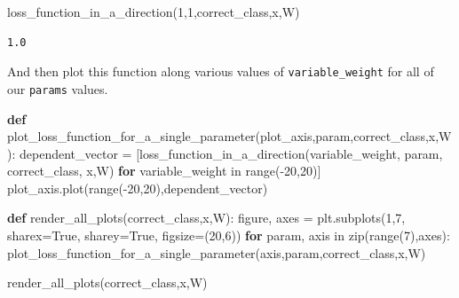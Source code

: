\documentclass[]{report}
\newenvironment{Shaded}{}{}
\newcommand{\KeywordTok}[1]{\textcolor[rgb]{0.00,0.44,0.13}{\textbf{{#1}}}}
\newcommand{\DecValTok}[1]{\textcolor[rgb]{0.25,0.63,0.44}{{#1}}}
\newcommand{\VariableTok}[1]{\textcolor[rgb]{0.10,0.09,0.49}{{#1}}}
\newcommand{\ControlFlowTok}[1]{\textcolor[rgb]{0.00,0.44,0.13}{\textbf{{#1}}}}
\newcommand{\OperatorTok}[1]{\textcolor[rgb]{0.40,0.40,0.40}{{#1}}}
\newcommand{\BuiltInTok}[1]{{#1}}
\newcommand{\NormalTok}[1]{{#1}}
\begin{document}
\begin{Shaded}
\begin{Highlighting}[]
\NormalTok{loss_function_in_a_direction(}\DecValTok{1}\NormalTok{,}\DecValTok{1}\NormalTok{,correct_class,x,W)}
\end{Highlighting}
\end{Shaded}

\begin{verbatim}
1.0
\end{verbatim}

And then plot this function along various values of
\texttt{variable\_weight} for all of our \texttt{params} values.

\begin{Shaded}
\begin{Highlighting}[]
\KeywordTok{def} \NormalTok{plot_loss_function_for_a_single_parameter(plot_axis,param,correct_class,x,W):}
    \NormalTok{dependent_vector }\OperatorTok{=} \NormalTok{[loss_function_in_a_direction(variable_weight,}
                                                     \NormalTok{param,}
                                                     \NormalTok{correct_class,}
                                                     \NormalTok{x,W) }
                        \ControlFlowTok{for} \NormalTok{variable_weight }\OperatorTok{in} \BuiltInTok{range}\NormalTok{(}\OperatorTok{-}\DecValTok{20}\NormalTok{,}\DecValTok{20}\NormalTok{)]}
    \NormalTok{plot_axis.plot(}\BuiltInTok{range}\NormalTok{(}\OperatorTok{-}\DecValTok{20}\NormalTok{,}\DecValTok{20}\NormalTok{),dependent_vector)}
    
\KeywordTok{def} \NormalTok{render_all_plots(correct_class,x,W):}
    \NormalTok{figure, axes }\OperatorTok{=} \NormalTok{plt.subplots(}\DecValTok{1}\NormalTok{,}\DecValTok{7}\NormalTok{, sharex}\OperatorTok{=}\VariableTok{True}\NormalTok{, sharey}\OperatorTok{=}\VariableTok{True}\NormalTok{, figsize}\OperatorTok{=}\NormalTok{(}\DecValTok{20}\NormalTok{,}\DecValTok{6}\NormalTok{))}
    \ControlFlowTok{for} \NormalTok{param, axis }\OperatorTok{in} \BuiltInTok{zip}\NormalTok{(}\BuiltInTok{range}\NormalTok{(}\DecValTok{7}\NormalTok{),axes):}
        \NormalTok{plot_loss_function_for_a_single_parameter(axis,param,correct_class,x,W)    }
\end{Highlighting}
\end{Shaded}

\begin{Shaded}
\begin{Highlighting}[]
\NormalTok{render_all_plots(correct_class,x,W)}
\end{Highlighting}
\end{Shaded}
\end{document}
